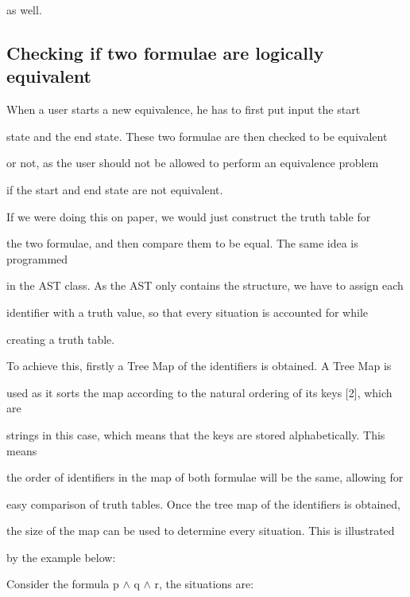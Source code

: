 \documentclass{report}
\begin{document}
as well.





\subsection{Checking if two formulae are logically equivalent}



When a user starts a new equivalence, he has to first put input the start

state and the end state. These two formulae are then checked to be equivalent

or not, as the user should not be allowed to perform an equivalence problem

if the start and end state are not equivalent.



If we were doing this on paper, we would just construct the truth table for

the two formulae, and then compare them to be equal. The same idea is programmed

in the AST class. As the AST only contains the structure, we have to assign each

identifier with a truth value, so that every situation is accounted for while

creating a truth table.



To achieve this, firstly a Tree Map of the identifiers is obtained. A Tree Map is

used as it sorts the map according to the natural ordering of its keys [2], which are

strings in this case, which means that the keys are stored alphabetically. This means

the order of identifiers in the map of both formulae will be the same, allowing for

easy comparison of truth tables. Once the tree map of the identifiers is obtained,

the size of the map can be used to determine every situation. This is illustrated

by the example below:



Consider the formula p $\land$ q $\land$ r, the situations are:
\end{document}
